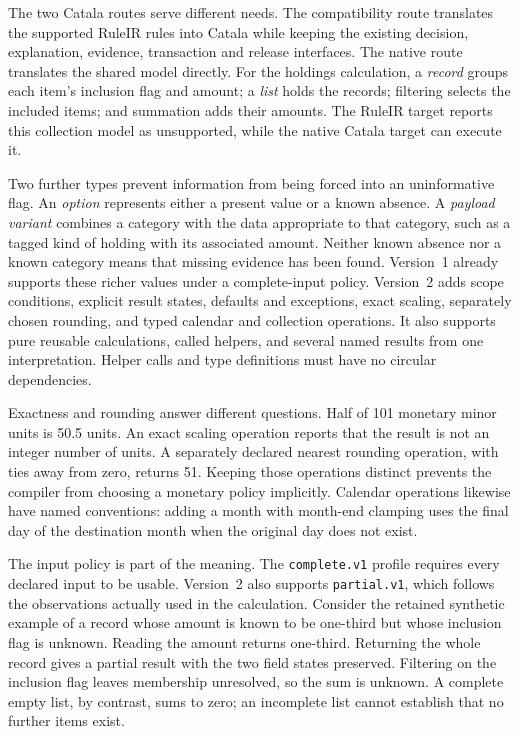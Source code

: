 \documentclass[12pt,a4paper,oneside,openany]{book}
\begin{document}
The two Catala routes serve different needs. The compatibility route translates
the supported RuleIR rules into Catala while keeping the existing decision,
explanation, evidence, transaction and release interfaces. The native route
translates the shared model directly. For the holdings calculation, a
\emph{record} groups each item's inclusion flag and amount; a \emph{list} holds
the records; filtering selects the included items; and summation adds their
amounts. The RuleIR target reports this collection model as unsupported, while
the native Catala target can execute it.

Two further types prevent information from being forced into an uninformative
flag. An \emph{option} represents either a present value or a known absence.
A \emph{payload variant} combines a category with the data appropriate to that
category, such as a tagged kind of holding with its associated amount. Neither
known absence nor a known category means that missing evidence has been found.
Version~1 already supports these richer values under a complete-input policy.
Version~2 adds scope conditions, explicit result states, defaults and exceptions,
exact scaling, separately chosen rounding, and typed calendar and collection
operations. It also supports pure reusable calculations, called helpers, and
several named results from one interpretation. Helper calls and type definitions
must have no circular dependencies.

Exactness and rounding answer different questions. Half of 101 monetary minor
units is 50.5 units. An exact scaling operation reports that the result is not
an integer number of units. A separately declared nearest rounding operation,
with ties away from zero, returns 51. Keeping those operations distinct prevents
the compiler from choosing a monetary policy implicitly. Calendar operations
likewise have named conventions: adding a month with month-end clamping uses
the final day of the destination month when the original day does not exist.

The input policy is part of the meaning. The \texttt{complete.v1} profile
requires every declared input to be usable. Version~2 also supports
\texttt{partial.v1}, which follows the observations actually used in the
calculation. Consider the retained synthetic example of a record whose amount
is known to be one-third but whose inclusion flag is unknown. Reading the
amount returns one-third. Returning the whole record gives a partial result
with the two field states preserved. Filtering on the inclusion flag leaves
membership unresolved, so the sum is unknown. A complete empty list, by
contrast, sums to zero; an incomplete list cannot establish that no further
items exist.
\end{document}
